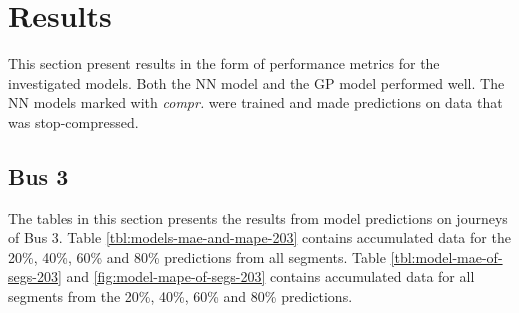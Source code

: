 
\captionsetup{width=.75\textwidth}


\chapter{Results}
\label{cha:results}
This section present results in the form of performance metrics for the investigated models. Both the NN model and the GP model performed well. The NN models marked with \emph{compr.} were trained and made predictions on data that was stop-compressed.

\section{Bus 3}
The tables in this section presents the results from model predictions on journeys of Bus 3. Table \ref{tbl:models-mae-and-mape-203} contains accumulated data for the 20\%, 40\%, 60\% and 80\% predictions from all segments. Table \ref{tbl:model-mae-of-segs-203} and \ref{fig:model-mape-of-segs-203} contains accumulated data for all segments from the 20\%, 40\%, 60\% and 80\% predictions.
 
